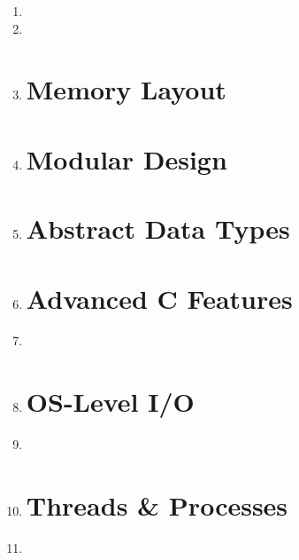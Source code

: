 \documentclass[11pt]{article}
\begin{document}
\begin{enumerate}
		\item 

		\item 

		\item 

		\section*{Memory Layout}
		\item 

		\section*{Modular Design}
		\item 

		\section*{Abstract Data Types}
		\item 

		\section*{Advanced C Features}
		\item 
		\item 

		\section*{OS-Level I/O}
		\item 
		\item 
		\newpage
		\section*{Threads \& Processes}
		\item 
	\end{enumerate}
\end{document}
